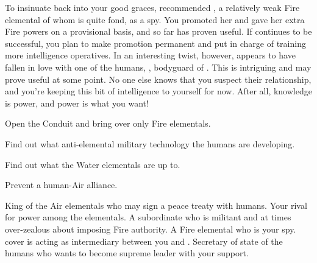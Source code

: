 \documentclass[char]{elementals}
\begin{document}
 To insinuate \cPyro{\themself} back into your good graces, \cPyro{} recommended \cJuliet{\intro}, a relatively weak Fire elemental of whom \cPyro{} is quite fond, as a spy.  You promoted her and gave her extra Fire powers on a provisional basis, and so far \cJuliet{\they} has proven useful.  If \cJuliet{\they} continues to be successful, you plan to make \cJuliet{\their} promotion permanent and put \cJuliet{\their} in charge of training more intelligence operatives.  In an interesting twist, however, \cJuliet{} appears to have fallen in love with one of the humans, \cRomeo{\intro}, bodyguard of \cLeader{}.  This is intriguing and may prove useful at some point.  No one else knows that you suspect their relationship, and you're keeping this bit of intelligence to yourself for now.  After all, knowledge is power, and power is what you want!




\begin{itemz}[Goals]
  \item Open the Conduit and bring over only Fire elementals.
  \item Find out what anti-elemental military technology the humans are developing.
  \item Find out what the Water elementals are up to.
  \item Prevent a human-Air alliance.
\end{itemz}

\begin{contacts}
  \contact{\cKing{}} King of the Air elementals who may sign a peace treaty with humans.  Your rival for power among the elementals.
  \contact{\cPyro{}} A subordinate who is militant and at times over-zealous about imposing Fire authority.
  \contact{\cJuliet{}} A Fire elemental who is your spy.  \cJuliet{\Their} cover is acting as intermediary between you and \cKing{}.
  \contact{\cDema{}} Secretary of state of the humans who wants to become supreme leader with your support.
\end{contacts}
\end{document}
